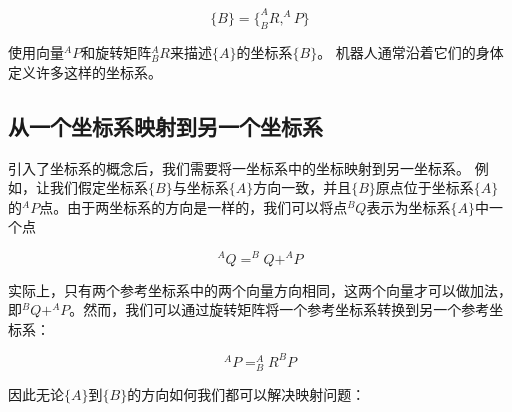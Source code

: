 \begin{equation}
\{B\}=\{^A_BR, ^AP\}
\end{equation}
%

使用向量$^AP$和旋转矩阵$^A_BR$来描述$\{A\}$的坐标系$\{B\}$。 机器人通常沿着它们的身体定义许多这样的坐标系。

\subsection{从一个坐标系映射到另一个坐标系}


引入了坐标系的概念后，我们需要将一坐标系中的坐标映射到另一坐标系。 例如，让我们假定坐标系$\{B\}$与坐标系$\{A\}$方向一致，并且$\{B\}$原点位于坐标系$\{A\}$的$^AP$点。由于两坐标系的方向是一样的，我们可以将点$^BQ$表示为坐标系$ \{A\} $中一个点

%
\begin{equation}
^AQ=^BQ+^AP
\end{equation}
%

实际上，只有两个参考坐标系中的两个向量方向相同，这两个向量才可以做加法，即$ ^BQ + ^AP $。然而，我们可以通过旋转矩阵将一个参考坐标系转换到另一个参考坐标系：

\begin{equation}
^AP=^A_BR^BP
\end{equation}
%

因此无论$\{A\}$到$ \{B\} $的方向如何我们都可以解决映射问题：

